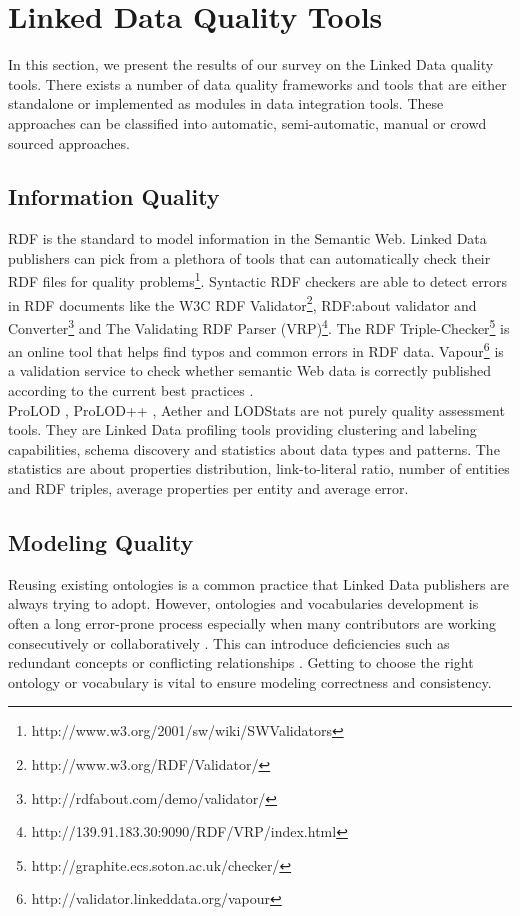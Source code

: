 \documentclass[onecolumn, crcready]{iosart2c}
\begin{document}
\section{Linked Data Quality Tools}
In this section, we present the results of our survey on the Linked Data quality tools. There exists a number of data quality frameworks and tools that are either standalone or implemented as modules in data integration tools. These approaches can be classified into automatic, semi-automatic, manual or crowd sourced approaches.

\subsection{Information Quality}

RDF is the standard to model information in the Semantic Web. Linked Data publishers can pick from a plethora of tools that can automatically check their RDF files for quality problems\footnote{http://www.w3.org/2001/sw/wiki/SWValidators}. Syntactic RDF checkers are able to detect errors in RDF documents like the W3C RDF Validator\footnote{http://www.w3.org/RDF/Validator/}, RDF:about validator and Converter\footnote{http://rdfabout.com/demo/validator/} and The Validating RDF Parser (VRP)\footnote{http://139.91.183.30:9090/RDF/VRP/index.html}. The RDF Triple-Checker\footnote{http://graphite.ecs.soton.ac.uk/checker/} is an online tool that helps find typos and common errors in RDF data. Vapour\footnote{http://validator.linkeddata.org/vapour} \cite{Berrueta08cookinghttp} is a validation service to check whether semantic Web data is correctly published according to the current best practices \cite{tim:linkedata}.\\
ProLOD \cite{Bohm2010}, ProLOD++ \cite{6816740}, Aether \cite{makela-aether-2014} and LODStats \cite{demter-2012-ekaw} are not purely quality assessment tools. They are Linked Data profiling tools providing clustering and labeling capabilities, schema discovery and statistics about data types and patterns. The statistics are about properties distribution, link-to-literal ratio, number of entities and RDF triples, average properties per entity and average error.

\subsection{Modeling Quality}

Reusing existing ontologies is a common practice that Linked Data publishers are always trying to adopt. However, ontologies and vocabularies development is often a long error-prone process especially when many contributors are working consecutively or collaboratively \cite{Suominen2013}. This can introduce deficiencies such as redundant concepts or conflicting relationships \cite{harpring_introduction_2010}. Getting to choose the right ontology or vocabulary is vital to ensure modeling correctness and consistency.\\
\end{document}

